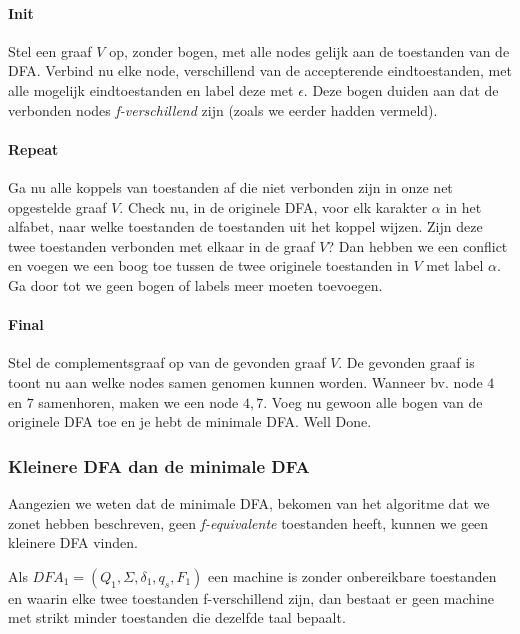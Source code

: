 \paragraph{Init} Stel een graaf $V$ op, zonder bogen, met alle nodes gelijk aan de toestanden van de DFA. Verbind nu elke node, verschillend van de accepterende eindtoestanden, met alle mogelijk eindtoestanden en label deze met $\epsilon$. Deze bogen duiden aan dat de verbonden nodes \textit{f-verschillend} zijn (zoals we eerder hadden vermeld).

\paragraph{Repeat} Ga nu alle koppels van toestanden af die niet verbonden zijn in onze net opgestelde graaf $V$. Check nu, in de originele DFA, voor elk karakter $\alpha$ in het alfabet, naar welke toestanden de toestanden uit het koppel wijzen. Zijn deze twee toestanden verbonden met elkaar in de graaf $V$? Dan hebben we een conflict en voegen we een boog toe tussen de twee originele toestanden in $V$ met label $\alpha$. Ga door tot we geen bogen of labels meer moeten toevoegen.

\paragraph{Final} Stel de complementsgraaf op van de gevonden graaf $V$. De gevonden graaf is toont nu aan welke nodes samen genomen kunnen worden. Wanneer bv. node $4$ en $7$ samenhoren, maken we een node $4,7$. Voeg nu gewoon alle bogen van de originele DFA toe en je hebt de minimale DFA. Well Done.

\subsubsection*{Kleinere DFA dan de minimale DFA}

Aangezien we weten dat de minimale DFA, bekomen van het algoritme dat we zonet hebben beschreven, geen \textit{f-equivalente} toestanden heeft, kunnen we geen kleinere DFA vinden.

\begin{theorem}
	Als $DFA_1 = (Q_1,\Sigma,\delta_1,q_s,F_1)$ een machine is zonder onbereikbare toestanden en waarin elke twee toestanden f-verschillend zijn, dan bestaat er geen machine met strikt minder toestanden die dezelfde taal bepaalt.
\end{theorem}


